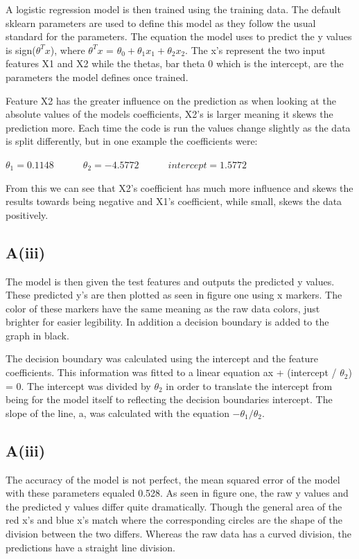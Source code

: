 \documentclass{article}
\begin{document}
A logistic regression model is then trained using the training data. The default sklearn parameters are used to define this model as they follow the usual standard for the parameters. The equation the model uses to predict the y values is sign($\theta^{T}x$), where $\theta^{T}x$ = $\theta_0 + \theta_1x_1 + \theta_2x_2$. The x's represent the two input features X1 and X2 while the thetas, bar theta 0 which is the intercept, are the parameters the model defines once trained. 

Feature X2 has the greater influence on the prediction as when looking at the absolute values of the models coefficients, X2's is larger meaning it skews the prediction more. Each time the code is run the values change slightly as the data is split differently, but in one example the coefficients were:

\begin{center} $\theta_1 = 0.1148 \quad \quad  \quad \theta_2 = -4.5772  \quad \quad  \quad intercept =  1.5772$\end{center}

From this we can see that X2's coefficient has much more influence and skews the results towards being negative and X1's coefficient, while small, skews the data positively.

\subsection{A(iii)}
The model is then given the test features and outputs the predicted y values. These predicted y's are then plotted as seen in figure one using x markers. The color of these markers have the same meaning as the raw data colors, just brighter for easier legibility. In addition a decision boundary is added to the graph in black. 

The decision boundary was calculated using the intercept and the feature coefficients. This information was fitted to a linear equation ax + (intercept / $\theta_2$) = 0. The intercept was divided by $\theta_2$ in order to translate the intercept from being for the model itself to reflecting the decision boundaries intercept. The slope of the line, a, was calculated with the equation $-\theta_1 / \theta_2$. 

\subsection{A(iii)}
The accuracy of the model is not perfect, the mean squared error of the model with these parameters equaled 0.528. As seen in figure one, the raw y values and the predicted y values differ quite dramatically. Though the general area of the red x's and blue x's match where the corresponding circles are the shape of the division between the two differs. Whereas the raw data has a curved division, the predictions have a straight line division. 
\end{document}

